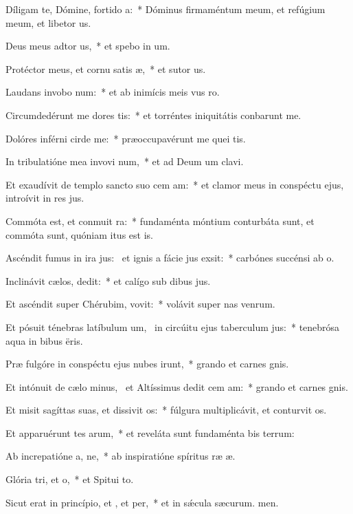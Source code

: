 \item Díligam te, Dómine, fortido a:~* Dóminus firmaméntum meum, et refúgium meum, et libetor us.
\item Deus meus adtor us,~* et spebo in um.
\item Protéctor meus, et cornu satis æ,~* et sutor us.
\item Laudans invobo num:~* et ab inimícis meis vus ro.
\item Circumdedérunt me dores tis:~* et torréntes iniquitátis conbarunt me.
\item Dolóres inférni cirde me:~* præoccupavérunt me quei tis.
\item In tribulatióne mea invovi num,~* et ad Deum um clavi.
\item Et exaudívit de templo sancto suo cem am:~* et clamor meus in conspéctu ejus, introívit in res jus.
\item Commóta est, et conmuit ra:~* fundaménta móntium conturbáta sunt, et commóta sunt, quóniam itus est is.
\item Ascéndit fumus in ira jus:~\pscross{} et ignis a fácie jus exsit:~* carbónes succénsi  ab o.
\item Inclinávit cælos,  dedit:~* et calígo sub dibus jus.
\item Et ascéndit super Chérubim,  vovit:~* volávit super nas venrum.
\item Et pósuit ténebras latíbulum um,~\pscross{} in circúitu ejus taberculum jus:~* tenebrósa aqua in bibus ëris.
\item Præ fulgóre in conspéctu ejus nubes irunt,~* grando et carnes gnis.
\item Et intónuit de cælo minus,~\pscross{} et Altíssimus dedit cem am:~* grando et carnes gnis.
\item Et misit sagíttas suas, et dissivit os:~* fúlgura multiplicávit, et conturvit os.
\item Et apparuérunt tes arum,~* et reveláta sunt fundaménta bis terrum:
\item Ab increpatióne a, ne,~* ab inspiratióne spíritus ræ æ.
\item Glória tri, et o,~* et Spitui to.
\item Sicut erat in princípio, et , et per,~* et in sǽcula sæcurum. men.
